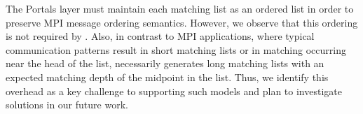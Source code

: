 The Portals layer must maintain each matching list as an ordered list in order
to preserve MPI message ordering semantics.  However, we observe that this
ordering is not required by \pdht.  Also, in contrast to MPI applications,
where typical communication patterns result in short matching lists or in
matching occurring near the head of the list, \pdht necessarily generates long
matching lists with an expected matching depth of the midpoint in the list.
Thus, we identify this overhead as a key challenge to supporting such models
and plan to investigate solutions in our future work.
